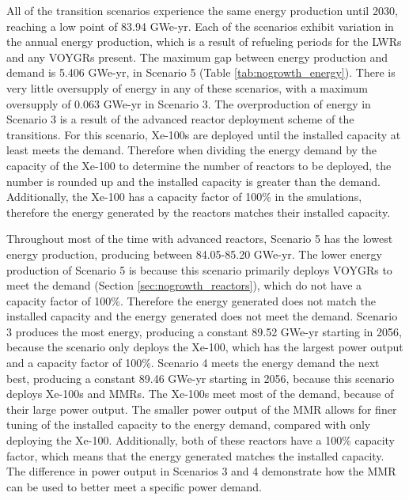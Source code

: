 All of the 
transition scenarios experience the same energy production until 2030,
reaching a low point of 83.94 GWe-yr. Each of the scenarios exhibit 
variation 
in the annual energy production, which is a result of refueling 
periods for the \glspl{LWR} and any VOYGRs present. The maximum gap between 
energy production and demand is 5.406 GWe-yr, in Scenario 5 
(Table \ref{tab:nogrowth_energy}). There 
is very little oversupply of energy in any of these scenarios, with a 
maximum oversupply of 0.063 GWe-yr in Scenario 3. The overproduction of 
energy in Scenario 3 is a result of the advanced reactor deployment scheme 
of the transitions. For this scenario, Xe-100s are deployed until the 
installed capacity at least meets the demand. Therefore when dividing the 
energy demand by the capacity of the Xe-100 to determine the number of 
reactors to be deployed, the number is rounded up and the installed capacity 
is greater than the demand. Additionally, the Xe-100
has a capacity factor of 100\% in the smulations, therefore the energy
generated by the reactors matches their installed capacity. 

Throughout 
most of the time with advanced reactors, Scenario 5 has the 
lowest energy 
production, producing between 84.05-85.20 GWe-yr. The lower energy 
production of Scenario 5 is because this scenario primarily deploys 
VOYGRs to meet the demand (Section \ref{sec:nogrowth_reactors}), which do 
not have a capacity factor of 100\%. Therefore the energy generated does 
not match the installed capacity and the energy generated does not meet the 
demand. 
Scenario 3 
produces the most energy, producing a constant 89.52 GWe-yr starting in 2056,
because the scenario only deploys the Xe-100, which has the largest 
power output  
and a capacity factor of 100\%.  Scenario 4 meets the 
energy demand the next best, producing a constant 89.46 GWe-yr starting in 
2056, because this scenario deploys Xe-100s and \glspl{MMR}. The 
Xe-100s meet most of the demand, because of their large power output.
The smaller power output of the \gls{MMR} allows for finer tuning of the 
installed capacity to the energy demand, compared with only deploying 
the Xe-100. Additionally, both of these reactors have a 100\% capacity 
factor, which means that the energy generated matches the installed capacity. 
The difference in power output in Scenarios 3 and 4 demonstrate how the 
\gls{MMR} can be used to better 
meet a specific power demand. 


